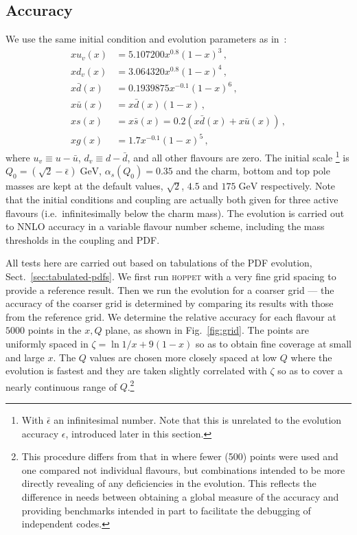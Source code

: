 \documentclass[12pt]{article}
\newcommand{\lp}{\left(}
\newcommand{\rp}{\right)}
\newcommand{\GeV}{\;\mathrm{GeV}}
\newcommand{\as}{\alpha_s}
\newcommand{\ie}{i.e.\ }
\newcommand{\hoppet}{\textsc{hoppet}\xspace}
\begin{document}
\subsection{Accuracy}
\label{sec:Accuracy}
We use the same initial condition and evolution parameters as
in~\cite{Benchmarks}:
\begin{subequations}
  \label{eq:init}
  \begin{align}
    x u_v(x)   &= 5.107200 x^{0.8} (1-x)^3\,,\\
    x d_v(x)   &= 3.064320 x^{0.8} (1-x)^4\,,\\
    x\bar d(x) &= 0.1939875 x^{-0.1} (1-x)^6\,,\\
    x\bar u(x) &= x\bar d(x) (1-x)\,,\\
    x     s(x) &= x\bar s(x) = 0.2(x\bar d(x) + x\bar u(x))\,,\\
    x g(x) &= 1.7 x^{-0.1} (1-x)^5\,,
  \end{align}
\end{subequations}
where $u_v \equiv u - \bar u$, $d_v \equiv d - \bar d$, and all other
flavours are zero. The initial scale
\footnote{With $\bar{\epsilon}$ an infinitesimal number. Note that
this is unrelated to the evolution accuracy $\epsilon$, introduced later
in this section.} is $Q_0 = \lp \sqrt{2}-\bar{\epsilon}
\rp \GeV$,
$\as(Q_0) = 0.35$ and the charm, bottom and top pole masses are kept
at the default values, $\sqrt{2}$, $4.5$ and $175\GeV$ respectively.
Note that the initial conditions 
and coupling are actually both given for three active
flavours (\ie infinitesimally below the charm mass). The evolution is
carried out to NNLO accuracy in a variable flavour number scheme,
including the mass thresholds in the coupling and PDF.

All tests here are carried out based on tabulations of the PDF
evolution, Sect.~\ref{sec:tabulated-pdfs}.
%
We first run \hoppet with a very fine grid spacing to provide a
reference result. Then we run the evolution for a coarser grid ---
the accuracy of the coarser grid is determined by comparing its
results with those from the reference grid. We determine the relative
accuracy for each flavour at $5000$ points in the $x, Q$ plane, as
shown in Fig.~\ref{fig:grid}. The points are uniformly spaced in
$\zeta = \ln 1/x + 9(1-x)$ so as to obtain fine coverage at small and
large $x$. The $Q$ values are chosen more closely spaced at low $Q$
where the evolution is fastest and they are taken slightly correlated
with $\zeta$ so as to cover a nearly continuous range of
$Q$.\footnote{This procedure differs from that in \cite{Benchmarks}
  where fewer (500) points were used and one compared not individual
  flavours, but combinations intended to be more directly revealing of
  any deficiencies in the evolution. This reflects the difference in
  needs between obtaining a global measure of the accuracy and
  providing benchmarks intended in part to facilitate the debugging of
  independent codes.}
\end{document}
